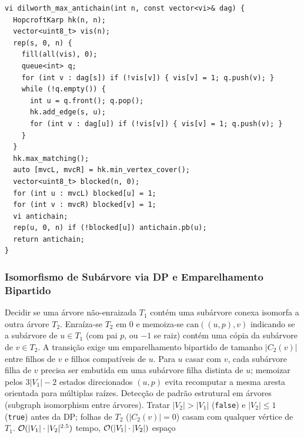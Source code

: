 \begin{lstlisting}
vi dilworth_max_antichain(int n, const vector<vi>& dag) {
  HopcroftKarp hk(n, n);
  vector<uint8_t> vis(n);
  rep(s, 0, n) {
    fill(all(vis), 0);
    queue<int> q;
    for (int v : dag[s]) if (!vis[v]) { vis[v] = 1; q.push(v); }
    while (!q.empty()) {
      int u = q.front(); q.pop();
      hk.add_edge(s, u);
      for (int v : dag[u]) if (!vis[v]) { vis[v] = 1; q.push(v); }
    }
  }
  hk.max_matching();
  auto [mvcL, mvcR] = hk.min_vertex_cover();
  vector<uint8_t> blocked(n, 0);
  for (int u : mvcL) blocked[u] = 1;
  for (int v : mvcR) blocked[v] = 1;
  vi antichain;
  rep(u, 0, n) if (!blocked[u]) antichain.pb(u);
  return antichain;
}
\end{lstlisting}

\subsubsection{Isomorfismo de Subárvore via DP e Emparelhamento Bipartido}
\algobox
  {Decidir se uma árvore não-enraizada $T_1$ contém uma subárvore conexa isomorfa a outra árvore $T_2$.}
  {Enraíza-se $T_2$ em $0$ e memoiza-se $\text{can}((u, p), v)$ indicando se a subárvore de $u \in T_1$ (com pai $p$, ou $-1$ se raiz) contém uma cópia da subárvore de $v \in T_2$. A transição exige um emparelhamento bipartido de tamanho $|C_2(v)|$ entre filhos de $v$ e filhos compatíveis de $u$.}
  {Para $u$ casar com $v$, cada subárvore filha de $v$ precisa ser embutida em uma subárvore filha distinta de $u$; memoizar pelos $3|V_1| - 2$ estados direcionados $(u, p)$ evita recomputar a mesma aresta orientada para múltiplas raízes.}
  {Detecção de padrão estrutural em árvores (subgraph isomorphism entre árvores).}
  {Tratar $|V_2| > |V_1|$ (\texttt{false}) e $|V_2| \le 1$ (\texttt{true}) antes da DP; folhas de $T_2$ ($|C_2(v)| = 0$) casam com qualquer vértice de $T_1$.}
  {$\mathcal{O}(|V_1| \cdot |V_2|^{2.5})$ tempo, $\mathcal{O}(|V_1| \cdot |V_2|)$ espaço}


